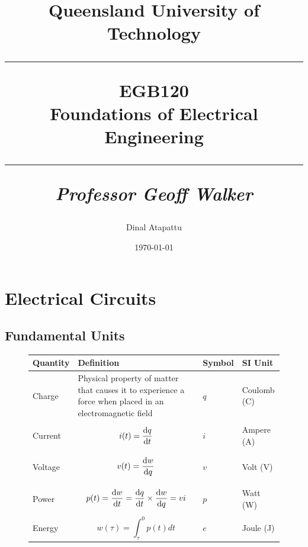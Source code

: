 \documentclass[oneside]{book}
\begin{document}
\pagestyle{fancy}
    \fancyhf{}
\fancyhead[R]{\nouppercase{\leftmark}}
\renewcommand{\footrulewidth}{0.4pt}
    \title{
            Queensland University of Technology\\
            \rule{\linewidth}{0.5pt}
        \centering
        \textbf{EGB120} \\
        Foundations of Electrical Engineering\\
        \vspace{0.4cm}
        \rule{\linewidth}{1.5pt}
        \small{\textit{Professor Geoff Walker}}
    }
    \author{Dinal Atapattu}
    \date{\today}
    \maketitle
    \thispagestyle{empty}
    \tableofcontents
        \chapter{Electrical Circuits}
            \section{Fundamental Units}
                \begin{figure}[H]
                    \centering
                    \begin{tabular}{|p{}|p{}|p{}|p{}|}
                        \hline
                        \textbf{Quantity} & \textbf{Definition} & \textbf{Symbol} & \textbf{SI Unit} \\
                        \hline
                        Charge & Physical property of matter that causes it to experience a force
                        when placed in an electromagnetic field & $q$ & Coulomb (C) \\
                        \hline
                        Current & \begin{equation*}i(t) = \odv{q}{t}\end{equation*} & $i$ & Ampere (A) \\
                        \hline
                        Voltage & \begin{equation*}v(t) = \odv{w}{q}\end{equation*} & $v$ & Volt (V) \\
                        \hline
                        Power & \begin{equation*}p(t) = \odv{w}{t} = \odv{q}{t} \times \odv{w}{q} = vi \end{equation*} & $p$ & Watt (W) \\
                        \hline
                        Energy & \begin{equation*}w(\tau) = \int_{\tau}^{0} p(t) dt\end{equation*} & $e$ & Joule (J) \\
                        \hline
                    \end{tabular}
                \end{figure}
\end{document}
